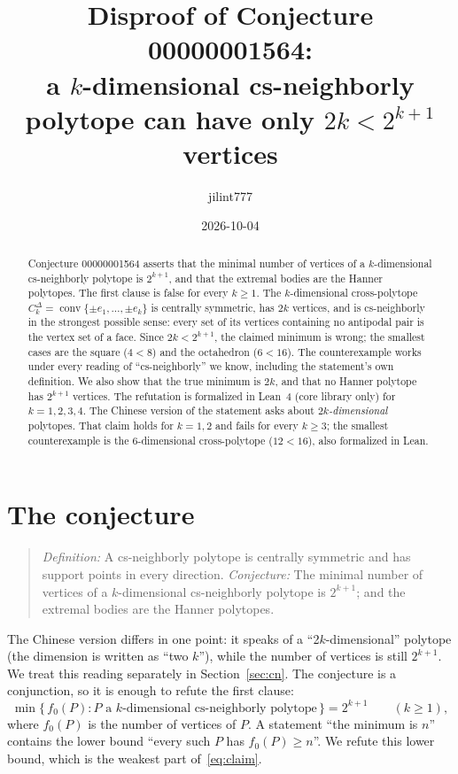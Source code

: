\documentclass[11pt]{article}
\title{Disproof of Conjecture 00000001564:\\
a $k$-dimensional cs-neighborly polytope can have only $2k<2^{k+1}$ vertices}
\author{jilint777}
\date{2026-10-04}
\theoremstyle{definition}
\theoremstyle{remark}
\begin{document}
\sloppy
\maketitle

\begin{abstract}
Conjecture 00000001564 asserts that the minimal number of vertices of a
$k$-dimensional cs-neighborly polytope is $2^{k+1}$, and that the extremal
bodies are the Hanner polytopes. The first clause is false for every $k\ge 1$.
The $k$-dimensional cross-polytope $C_k^\Delta=\operatorname{conv}\{\pm e_1,\dots,\pm e_k\}$
is centrally symmetric, has $2k$ vertices, and is cs-neighborly in the
strongest possible sense: every set of its vertices containing no antipodal pair
is the vertex set of a face. Since $2k<2^{k+1}$, the claimed minimum is wrong;
the smallest cases are the square ($4<8$) and the octahedron ($6<16$). The
counterexample works under every reading of ``cs-neighborly'' we know, including
the statement's own definition. We also show that the true minimum is $2k$, and
that no Hanner polytope has $2^{k+1}$ vertices. The refutation is formalized in
Lean~4 (core library only) for $k=1,2,3,4$. The Chinese version of the statement
asks about \emph{$2k$-dimensional} polytopes. That claim holds for $k=1,2$ and fails for
every $k\ge3$; the smallest counterexample is the $6$-dimensional cross-polytope
($12<16$), also formalized in Lean.
\end{abstract}

\section{The conjecture}
\begin{quote}
\emph{Definition:} A cs-neighborly polytope is centrally symmetric and has
support points in every direction. \emph{Conjecture:} The minimal number of
vertices of a $k$-dimensional cs-neighborly polytope is $2^{k+1}$; and the
extremal bodies are the Hanner polytopes.
\end{quote}
The Chinese version differs in one point: it speaks of a ``2$k$-dimensional''
polytope (the dimension is written as ``two $k$''), while the number of vertices is still
$2^{k+1}$. We treat this reading separately in Section~\ref{sec:cn}. The conjecture is a
conjunction, so it is enough to refute the first clause:
\begin{equation}\label{eq:claim}
\textstyle\min\{\,f_0(P) : P \text{ a $k$-dimensional cs-neighborly polytope}\,\} = 2^{k+1}
\qquad(k\ge 1),
\end{equation}
where $f_0(P)$ is the number of vertices of $P$. A statement ``the minimum is $n$''
contains the lower bound ``every such $P$ has $f_0(P)\ge n$''. We refute this lower bound,
which is the weakest part of~\eqref{eq:claim}.
\end{document}

